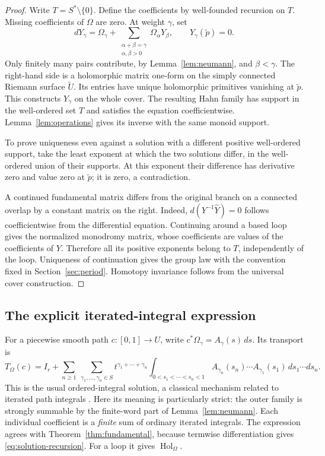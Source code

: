 \documentclass[11pt,letterpaper]{article}
\numberwithin{equation}{section}
\theoremstyle{definition}
\theoremstyle{remark}
\newcommand{\Hol}{\operatorname{Hol}}
\begin{document}
\begin{proof}
Write $T=S^*\setminus\{0\}$. Define the coefficients by well-founded
recursion on $T$. Missing coefficients of $\Omega$ are zero. At weight
$\gamma$, set
\begin{equation}\label{eq:solution-recursion}
 dY_\gamma=\Omega_\gamma+
   \sum_{\substack{\alpha+\beta=\gamma\\\alpha,\beta>0}}
       \Omega_\alpha Y_\beta,
 \qquad Y_\gamma(\widetilde p)=0.
\end{equation}
Only finitely many pairs contribute, by Lemma~\ref{lem:neumann}, and
$\beta<\gamma$. The right-hand side is a holomorphic matrix one-form on the
simply connected Riemann surface $\widetilde U$. Its entries have unique
holomorphic primitives vanishing at $\widetilde p$. This constructs
$Y_\gamma$ on the whole cover. The resulting Hahn family has support in the
well-ordered set $T$ and satisfies the equation coefficientwise.
Lemma~\ref{lem:operations} gives its inverse with the same monoid support.

To prove uniqueness even against a solution with a different positive
well-ordered support, take the least exponent at which the two solutions
differ, in the well-ordered union of their supports. At this exponent their
difference has derivative zero and value zero at $\widetilde p$; it is zero,
a contradiction.

A continued fundamental matrix differs from the original branch on a
connected overlap by a constant matrix on the right. Indeed,
$d(Y^{-1}\widehat Y)=0$ follows coefficientwise from the differential
equation. Continuing around a based loop gives the normalized monodromy
matrix, whose coefficients are values of the coefficients of $Y$. Therefore
all its positive exponents belong to $T$, independently of the loop.
Uniqueness of continuation gives the group law with the convention fixed
in Section~\ref{sec:period}. Homotopy invariance follows from the universal
cover construction.
\end{proof}

\subsection{The explicit iterated-integral expression}
For a piecewise smooth path $c:[0,1]\to U$, write
$c^*\Omega_\gamma=A_\gamma(s)\,ds$. Its transport is
\begin{equation}\label{eq:dyson}
 T_\Omega(c)=I_r+
 \sum_{n\geq1}\ \sum_{\gamma_1,\ldots,\gamma_n\in S}
 t^{\gamma_1+\cdots+\gamma_n}
 \int_{0<s_1<\cdots<s_n<1}
 A_{\gamma_n}(s_n)\cdots A_{\gamma_1}(s_1)\,ds_1\cdots ds_n.
\end{equation}
This is the usual ordered-integral solution, a classical mechanism related
to iterated path integrals \cite{chen}. Here its meaning is particularly
strict: the outer family is strongly summable by the finite-word part of
Lemma~\ref{lem:neumann}. Each individual coefficient is a \emph{finite} sum
of ordinary iterated integrals. The expression agrees with
Theorem~\ref{thm:fundamental}, because termwise differentiation gives
\eqref{eq:solution-recursion}. For a loop it gives $\Hol_\Omega$.
\end{document}
